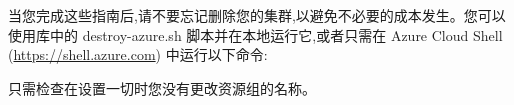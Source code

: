 当您完成这些指南后,请不要忘记删除您的集群,以避免不必要的成本发生。您可以使用库中的 destroy-azure.sh 脚本并在本地运行它,或者只需在 Azure Cloud Shell (\url{https://shell.azure.com}) 中运行以下命令:


只需检查在设置一切时您没有更改资源组的名称。
